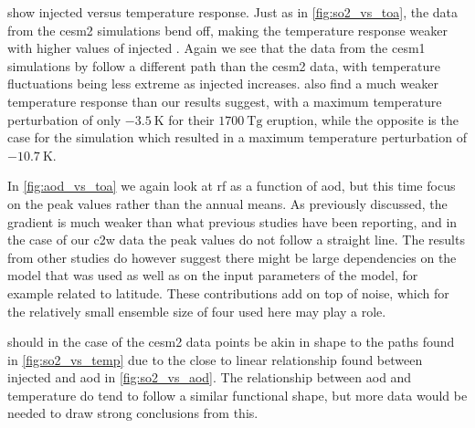 \documentclass{ametsocV5}
\newcommand{\iso}[1][i]{{#1}njected \ce{SO2}}
\begin{document}
 show \iso{} versus temperature response. Just as in
\cref{fig:so2_vs_toa}, the data from the \ac{cesm2} simulations bend off, making the
temperature response weaker with higher values of \iso. Again we see that the data from
the \ac{cesm1} simulations by \citet{ottobliesner2016} follow a different path than the
\ac{cesm2} data, with temperature fluctuations being less extreme as \iso{} increases.
\citet{timmreck2010} also find a much weaker temperature response than our results
suggest, with a maximum temperature perturbation of only \(\SI{-3.5}{\kelvin}\) for
their \(\SI{1700}{\tera\gram}\)  eruption, while the opposite is the case for
the \citet{jones2005} simulation which resulted in a maximum temperature perturbation of
\(\SI{-10.7}{\kelvin}\).


In \cref{fig:aod_vs_toa} we again look at \ac{rf} as a function of \ac{aod}, but this
time focus on the peak values rather than the annual means. As previously discussed, the
gradient is much weaker than what previous studies have been reporting, and in the case
of our \ac{c2w} data the peak values do not follow a straight line. The results from
other studies \citep{jones2005, ottobliesner2016, timmreck2010} do however suggest there
might be large dependencies on the model that was used as well as on the input
parameters of the model, for example related to latitude. These contributions add on top
of noise, which for the relatively small ensemble size of four used here may play a
role.


 should in the case of the \ac{cesm2} data points be akin in shape
to the paths found in \cref{fig:so2_vs_temp} due to the close to linear relationship
found between \iso{} and \ac{aod} in \cref{fig:so2_vs_aod}. The relationship between
\ac{aod} and temperature do tend to follow a similar functional shape, but more data
would be needed to draw strong conclusions from this.
\end{document}
